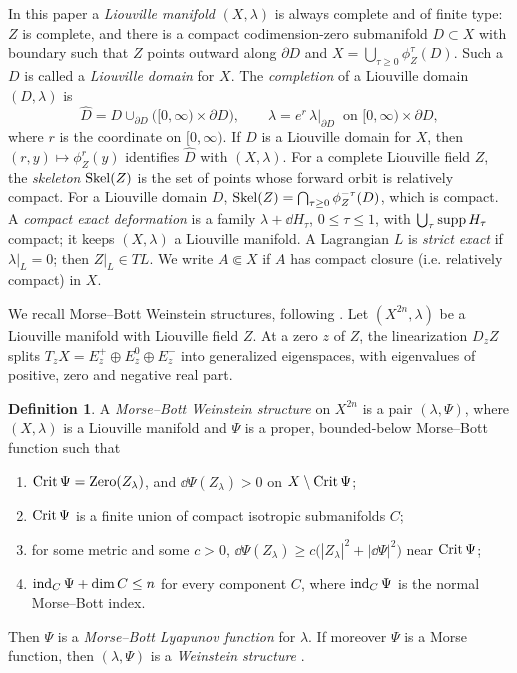 \documentclass[12pt, letter]{amsart}
\theoremstyle{definition}
\newtheorem{definition}[dummy]{Definition}
\begin{document}
In this paper a \emph{Liouville manifold} $(X,\lambda)$ is always complete and of finite type:
$Z$ is complete, and there is a compact codimension-zero submanifold $D\subset X$ with boundary such that $Z$ points outward along $\partial D$ and $X=\bigcup_{\tau\ge0}\phi_Z^\tau(D)$.
Such a $D$ is called a \emph{Liouville domain} for $X$.
The \emph{completion} of a Liouville domain $(D,\lambda)$ is
\[
 \widehat D=D\cup_{\partial D}\bigl([0,\infty)\times\partial D\bigr),\qquad \lambda=e^r\,\lambda|_{\partial D}\ \text{ on }[0,\infty)\times\partial D,
\]
where $r$ is the coordinate on $[0,\infty)$.
If $D$ is a Liouville domain for \(X\), then $(r,y)\mapsto\phi_Z^r(y)$ identifies $\widehat D$ with $(X,\lambda)$.
For a complete Liouville field $Z$, the \emph{skeleton} $\operatorname{Skel}(Z)$ is the set of points whose forward orbit is relatively compact.
For a Liouville domain $D$,
$\operatorname{Skel}(Z)=\bigcap_{\tau\ge0}\phi_Z^{-\tau}(D)$, which is compact.
A \emph{compact exact deformation} is a family $\lambda+\dd H_\tau$, $0\le\tau\le1$, with $\bigcup_\tau\operatorname{supp} H_\tau$ compact; it keeps $(X,\lambda)$ a Liouville manifold.
A Lagrangian $L$ is \emph{strict exact} if $\lambda|_L=0$; then $Z|_L\in TL$.
We write $A\Subset X$ if $A$ has compact closure (i.e. relatively compact) in $X$.

We recall Morse--Bott Weinstein structures, following \cite{Eli18,AGEN}.
Let $(X^{2n},\lambda)$ be a Liouville manifold with Liouville field $Z$.
At a zero $z$ of $Z$, the linearization $D_zZ$ splits $T_zX=E^+_z\oplus E^0_z\oplus E^-_z$ into generalized eigenspaces, with eigenvalues of positive, zero and negative real part.

\begin{definition}\label{def:quantitative}
A \emph{Morse--Bott Weinstein structure} on $X^{2n}$ is a pair $(\lambda,\Psi)$, where $(X,\lambda)$ is a Liouville manifold and $\Psi$ is a proper, bounded-below Morse--Bott function such that
\begin{enumerate}[label=\textup{(\roman*)}]
\item $\operatorname{Crit}\Psi=\operatorname{Zero}(Z_\lambda)$, and $\dd\Psi(Z_\lambda)>0$ on $X\setminus\operatorname{Crit}\Psi$;
\item $\operatorname{Crit}\Psi$ is a finite union of compact isotropic submanifolds $C$;
\item for some metric and some $c>0$, $\dd\Psi(Z_\lambda)\ge c\bigl(|Z_\lambda|^2+|\dd\Psi|^2\bigr)$ near $\operatorname{Crit}\Psi$;
\item $\operatorname{ind}_C\Psi+\dim C\le n$ for every component $C$, where $\operatorname{ind}_C\Psi$ is the normal Morse--Bott index.
\end{enumerate}
Then $\Psi$ is a \emph{Morse--Bott Lyapunov function} for $\lambda$.
If moreover $\Psi$ is a Morse function, then $(\lambda,\Psi)$ is a \emph{Weinstein structure} \cite[Chapter~11]{CE}.
\end{definition}
\end{document}
